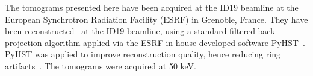 The tomograms presented here have been acquired at the ID19 beamline at the
European Synchrotron Radiation Facility (ESRF) in Grenoble, France. They have
been reconstructed~\citep{sporring} at the ID19 beamline, using a standard
filtered back-projection algorithm applied via the ESRF in-house developed
software PyHST~\citep{NELDAM2015682,pyhst}. PyHST was applied to improve
reconstruction quality, hence reducing ring artifacts~\cite{MIRONE201441}. The
tomograms were acquired at 50 keV.

